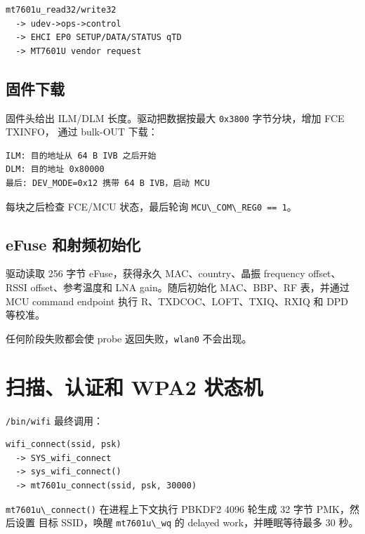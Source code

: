 \begin{lstlisting}
mt7601u_read32/write32
  -> udev->ops->control
  -> EHCI EP0 SETUP/DATA/STATUS qTD
  -> MT7601U vendor request
\end{lstlisting}

\subsection{固件下载}\label{ux56faux4ef6ux4e0bux8f7d}

固件头给出 ILM/DLM 长度。驱动把数据按最大
\passthrough{\lstinline!0x3800!} 字节分块，增加 FCE TXINFO， 通过
bulk-OUT 下载：

\begin{lstlisting}
ILM: 目的地址从 64 B IVB 之后开始
DLM: 目的地址 0x80000
最后: DEV_MODE=0x12 携带 64 B IVB，启动 MCU
\end{lstlisting}

每块之后检查 FCE/MCU 状态，最后轮询
\passthrough{\lstinline!MCU\_COM\_REG0 == 1!}。

\subsection{eFuse
和射频初始化}\label{efuse-ux548cux5c04ux9891ux521dux59cbux5316}

驱动读取 256 字节 eFuse，获得永久 MAC、country、晶振 frequency
offset、RSSI offset、参考温度和 LNA gain。随后初始化 MAC、BBP、RF
表，并通过 MCU command endpoint 执行 R、TXDCOC、LOFT、TXIQ、RXIQ 和 DPD
等校准。

任何阶段失败都会使 probe 返回失败，\passthrough{\lstinline!wlan0!}
不会出现。

\section{扫描、认证和 WPA2
状态机}\label{ux626bux63cfux8ba4ux8bc1ux548c-wpa2-ux72b6ux6001ux673a}

\passthrough{\lstinline!/bin/wifi!} 最终调用：

\begin{lstlisting}
wifi_connect(ssid, psk)
  -> SYS_wifi_connect
  -> sys_wifi_connect()
  -> mt7601u_connect(ssid, psk, 30000)
\end{lstlisting}

\passthrough{\lstinline!mt7601u\_connect()!} 在进程上下文执行 PBKDF2
4096 轮生成 32 字节 PMK，然后设置 目标 SSID，唤醒
\passthrough{\lstinline!mt7601u\_wq!} 的 delayed work，并睡眠等待最多 30
秒。


